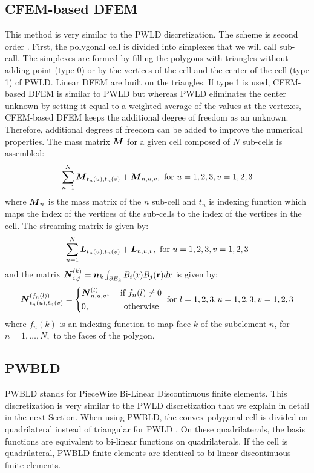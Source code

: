 \subsection{CFEM-based DFEM}
This method is very similar to the PWLD discretization. The scheme is second
order \cite{Warsa2008}. First, the polygonal cell is divided into simplexes
that we will call sub-call. The simplexes are formed by filling the polygons
with triangles without adding point (type 0) or by the vertices of the
cell and the center of the cell (type 1) cf PWLD. Linear DFEM are built on the 
triangles. If type 1 is used, CFEM-based DFEM is similar to PWLD but whereas
PWLD eliminates the center unknown by setting it equal to a weighted average
of the values at the vertexes, CFEM-based DFEM keeps the additional degree of
freedom as an unknown. Therefore, additional degrees of freedom can be added
to improve the numerical properties. The mass matrix $\boldsymbol{M}$ for a given cell
composed of $N$ sub-cells is assembled:
\begin{equation}
  \sum_{n=1}^N \boldsymbol{M}_{t_n(u),t_n(v)} + \boldsymbol{M}_{n,u,v}, \textrm{ for }
  u=1,2,3, v=1,2,3
\end{equation}
where $\boldsymbol{M}_n$ is the mass matrix of the $n$ sub-cell and $t_n$ is indexing
function which maps the index of the vertices of the sub-cells to the index of
the vertices in the cell. The streaming matrix is given by:
\begin{equation}
  \sum_{n=1}^N \boldsymbol{L}_{t_n(u),t_n(v)} + \boldsymbol{L}_{n,u,v}, \textrm{ for }
  u=1,2,3, v=1,2,3
\end{equation}
and the matrix $\boldsymbol{N}_{i,j}^{(k)} = \boldsymbol{n}_k \int_{\partial E_k} B_i(\mathbf{r})
B_j(\mathbf{r}) d\mathbf{r}$ is given by:
\begin{equation}
  \boldsymbol{N}_{t_n(u),t_n(v)}^{(f_n(l))} = \left\{
    \begin{aligned}
      & \boldsymbol{N}_{n,u,v}^{(l)}, & \textrm{ if }f_n(l)\neq 0\\
      & 0, & \textrm{ otherwise }
    \end{aligned}
    \right.
    \textrm{ for } l=1,2,3,u=1,2,3,v=1,2,3
\end{equation}
where $f_n(k)$ is an indexing function to map face $k$ of the subelement $n$,
for $n=1,\hdots,N,$ to the faces of the polygon.
\subsection{PWBLD}
PWBLD stands for PieceWise Bi-Linear Discontinuous finite elements. This 
discretization is very similar to the PWLD discretization that we explain
in detail in the next Section. When using PWBLD, the convex polygonal cell is 
divided on quadrilateral instead of triangular for PWLD \cite{Bailey2011}. On 
these quadrilaterals, the basis functions are equivalent to bi-linear functions 
on quadrilaterals. If the cell is quadrilateral, PWBLD finite elements are 
identical to bi-linear discontinuous finite elements.
